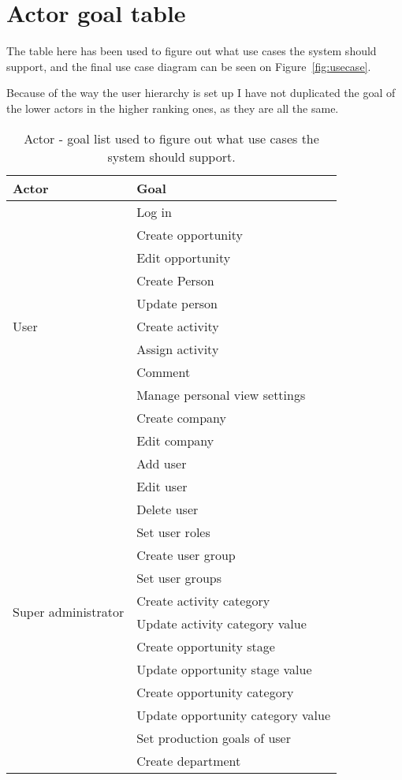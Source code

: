 \chapter{Actor goal table}
\label{app:actor-goal}
The table here has been used to figure out what use cases the system should support, and the final use case diagram can be seen on Figure~\ref{fig:usecase}.

Because of the way the user hierarchy is set up I have not duplicated the goal of the lower actors in the higher ranking ones, as they are all the same.

\begin{table}[h]
  \begin{tabular}{l|l}
    Actor & Goal \\ \hline
    \multirow{11}{*}{User}
    & Log in \\
    & Create opportunity \\
    & Edit opportunity \\
    & Create Person \\
    & Update person \\
    & Create activity \\
    & Assign activity \\
    & Comment \\
    & Manage personal view settings \\
    & Create company \\
    & Edit company \\
    \hline
    \multirow{14}{*}{Super administrator}
    & Add user \\
    & Edit user \\
    & Delete user \\
    & Set user roles \\
    & Create user group \\
    & Set user groups \\
    & Create activity category \\
    & Update activity category value \\
    & Create opportunity stage \\
    & Update opportunity stage value \\
    & Create opportunity category \\
    & Update opportunity category value \\
    & Set production goals of user \\
    & Create department
  \end{tabular}
  \caption{Actor - goal list used to figure out what use cases the system should support.}
  \label{tab:actor-loal-list}
\end{table}
